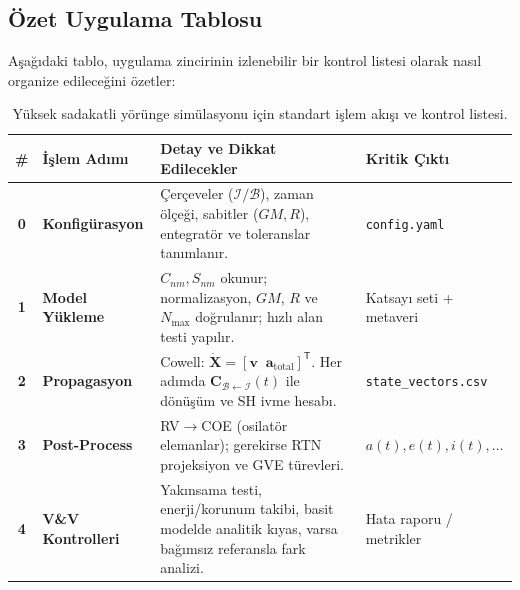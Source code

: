 \subsection{Özet Uygulama Tablosu}
Aşağıdaki tablo, uygulama zincirinin izlenebilir bir kontrol listesi olarak nasıl organize edileceğini özetler:

\begin{table}[h]
\centering
\renewcommand{\arraystretch}{1.25}
\small
\begin{tabular}{|c|l|p{7.2cm}|l|}
\hline
\textbf{\#} & \textbf{İşlem Adımı} & \textbf{Detay ve Dikkat Edilecekler} & \textbf{Kritik Çıktı} \\ \hline
\textbf{0} & \textbf{Konfigürasyon} &
Çerçeveler ($\mathcal I/\mathcal B$), zaman ölçeği, sabitler ($GM,R$), entegratör ve toleranslar tanımlanır. &
\texttt{config.yaml} \\ \hline
\textbf{1} & \textbf{Model Yükleme} &
$C_{nm},S_{nm}$ okunur; normalizasyon, $GM$, $R$ ve $N_{\max}$ doğrulanır; hızlı alan testi yapılır. &
Katsayı seti + metaveri \\ \hline
\textbf{2} & \textbf{Propagasyon} &
Cowell: $\dot{\mathbf X}=[\mathbf v\;\;\mathbf a_{\text{total}}]^{\mathsf T}$.
Her adımda $\mathbf C_{\mathcal B\leftarrow\mathcal I}(t)$ ile dönüşüm ve SH ivme hesabı. &
\texttt{state\_vectors.csv} \\ \hline
\textbf{3} & \textbf{Post-Process} &
RV$\rightarrow$COE (osilatör elemanlar); gerekirse RTN projeksiyon ve GVE türevleri. &
$a(t),e(t),i(t),\dots$ \\ \hline
\textbf{4} & \textbf{V\&V Kontrolleri} &
Yakınsama testi, enerji/korunum takibi, basit modelde analitik kıyas, varsa bağımsız referansla fark analizi. &
Hata raporu / metrikler \\ \hline
\end{tabular}
\caption{Yüksek sadakatli yörünge simülasyonu için standart işlem akışı ve kontrol listesi.}
\label{tab:workflow_summary}
\end{table}

\vspace{0.6cm}

